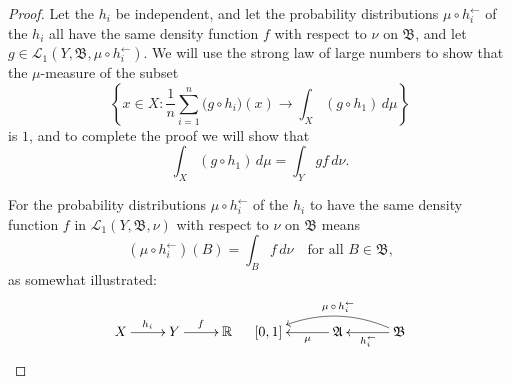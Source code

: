 \documentclass[
twoside=true,
paper=letter,
fontsize=11pt,
pagesize=auto,
leqno,
openany,
headsepline,
overfullrule,
]{scrbook}
\theoremstyle{plain}
\theoremstyle{plain}
\theoremstyle{definition}
\theoremstyle{bfnoteitalic}
\theoremstyle{bfnoteroman}
\newcommand{\sigalg}[1]{\mathfrak{#1}}
\newcommand{\cali}[1]{\mathscr{#1}}
\newcommand{\preimage}[1]{#1^{\leftarrow}}
\newcommand{\R}{\mathbb{R}}
\newcommand{\sigmaalgebra}{\sigalg{A}}
\newcommand{\sigmaalgebraii}{\sigalg{B}}
\newcommand{\funcf}{f}
\newcommand{\funcg}{g}
\newcommand{\funch}{h}
\newcommand{\function}{f}
\newcommand{\measurespace}{X}
\newcommand{\measurespaceii}{Y}
\newcommand{\mspaceelt}{x}
\newcommand{\measure}{\mu}
\newcommand{\measmu}{\mu}
\newcommand{\measnu}{\nu}
\newcommand{\setii}{B}
\begin{document}
\begin{proof}
Let the $\funch_i$ be independent, and let the probability distributions 
$\measure\circ\preimage{\funch_i}$
of the $\funch_i$ all have the same density function $\function$ with respect to 
$\measnu$ on $\sigmaalgebraii$, and let 
$\funcg\in
\cali{L}_1(\measurespaceii,\sigmaalgebraii,\measmu\circ\preimage{\funch_i})$.
We will use the strong law of large numbers to show that the $\measure$-measure of the subset
\[
\left\{ 
\mspaceelt\in\measurespace : 
\frac{1}{n} \sum_{i=1}^n \bigl( \funcg \circ \funch_i \bigr) (x) \to
\int_\measurespace (\funcg \circ \funch_1) \,d\measure 
\right\}
\]
is $1$, and to complete the proof we will show that
\[
\int_\measurespace (\funcg \circ \funch_1) \,d\measure
=
\int_\measurespaceii \funcg \funcf \,d\measnu.
\]


For the probability distributions 
$\measure\circ\preimage{\funch_i}$
of the $\funch_i$ to have the same density function 
$\funcf$ in $\cali{L}_1(\measurespaceii,\sigmaalgebraii,\measnu)$ 
with respect to  $\measnu$ on $\sigmaalgebraii$ means
\[
(\measmu\circ\preimage{\funch_i})(\setii)
=
\int_\setii \funcf\, d\measnu
\quad\text{for all $\setii\in\sigmaalgebraii$,}
\]
as somewhat illustrated:
\[
\xymatrix@R=18pt{
\measurespace \ar[r]^{\funch_i} 
& \measurespaceii \ar[r]^{\funcf} 
& \R \\
}
\quad
\xymatrix@R=18pt@C=30pt{
[0,1]
& \sigmaalgebra 
\ar[l]^-\measmu
& \sigmaalgebraii
\ar[l]^{\preimage{\funch_i}} 
\ar@/_12pt/[ll]_-{\measmu\,\circ\,\preimage{\funch_i}}
}
\]


\end{proof}
\end{document}
